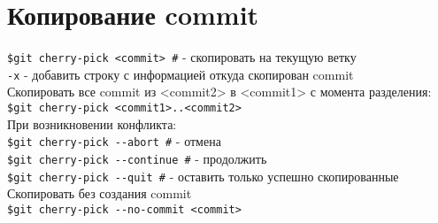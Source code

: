 \section{Копирование commit}

\texttt{\$git cherry-pick <commit> \indent\#} - скопировать на текущую ветку \\
\indent\texttt{-x} - добавить строку с информацией откуда скопирован commit \\

\noindent Скопировать все commit из <commit2> в <commit1> с момента разделения: \\
\indent\texttt{\$git cherry-pick <commit1>..<commit2>}\\

\noindent При возникновении конфликта: \\
\indent\texttt{\$git cherry-pick {-}-abort \indent\#} - отмена \\
\indent\texttt{\$git cherry-pick {-}-continue \indent\#} - продолжить \\
\indent\texttt{\$git cherry-pick {-}-quit \indent\#} - оставить только успешно скопированные \\

\noindent Скопировать без создания commit \\
\indent\texttt{\$git cherry-pick {-}-no-commit <commit>} \\